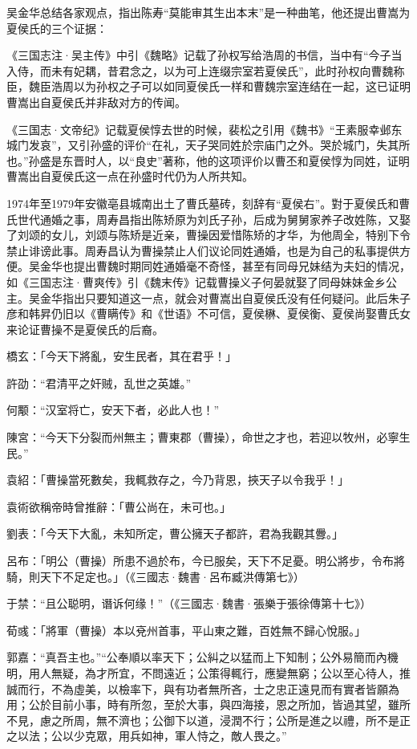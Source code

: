 吴金华总结各家观点，指出陈寿“莫能审其生出本末”是一种曲笔，他还提出曹嵩为夏侯氏的三个证据：

《三国志注·吴主传》中引《魏略》记载了孙权写给浩周的书信，当中有“今子当入侍，而未有妃耦，昔君念之，以为可上连缀宗室若夏侯氏”，此时孙权向曹魏称臣，魏臣浩周以为孙权之子可以如同夏侯氏一样和曹魏宗室连结在一起，这已证明曹嵩出自夏侯氏并非敌对方的传闻。

《三国志·文帝纪》记载夏侯惇去世的时候，裴松之引用《魏书》“王素服幸邺东城门发哀”，又引孙盛的评价“在礼，天子哭同姓於宗庙门之外。哭於城门，失其所也。”孙盛是东晋时人，以“良史”著称，他的这项评价以曹丕和夏侯惇为同姓，证明曹嵩出自夏侯氏这一点在孙盛时代仍为人所共知。

1974年至1979年安徽亳县城南出土了曹氏墓砖，刻辞有“夏侯右”。對于夏侯氏和曹氏世代通婚之事，周寿昌指出陈矫原为刘氏子孙，后成为舅舅家养子改姓陈，又娶了刘颂的女儿，刘颂与陈矫是近亲，曹操因爱惜陈矫的才华，为他周全，特别下令禁止诽谤此事。周寿昌认为曹操禁止人们议论同姓通婚，也是为自己的私事提供方便。吴金华也提出曹魏时期同姓通婚毫不奇怪，甚至有同母兄妹结为夫妇的情况，如《三国志注·曹爽传》引《魏末传》记载曹操义子何晏就娶了同母妹妹金乡公主。吴金华指出只要知道这一点，就会对曹嵩出自夏侯氏没有任何疑问。此后朱子彦和韩昇仍旧以《曹瞒传》和《世语》不可信，夏侯楙、夏侯衡、夏侯尚娶曹氏女来论证曹操不是夏侯氏的后裔。

橋玄：「今天下將亂，安生民者，其在君乎！」

許劭：“君清平之奸贼，乱世之英雄。”

何颙：“汉室将亡，安天下者，必此人也！”

陳宮：“今天下分裂而州無主；曹東郡（曹操），命世之才也，若迎以牧州，必寧生民。”

袁紹：「曹操當死數矣，我輒救存之，今乃背恩，挾天子以令我乎！」

袁術欲稱帝時曾推辭：「曹公尚在，未可也。」

劉表：「今天下大亂，未知所定，曹公擁天子都許，君為我觀其釁。」

呂布：「明公（曹操）所患不過於布，今已服矣，天下不足憂。明公將步，令布將騎，則天下不足定也。」（《三國志·魏書·呂布臧洪傳第七》）

于禁：“且公聪明，谮诉何缘！”（《三國志·魏書·張樂于張徐傳第十七》）

荀彧：「將軍（曹操）本以兗州首事，平山東之難，百姓無不歸心悅服。」

郭嘉：“真吾主也。”“公奉順以率天下；公糾之以猛而上下知制；公外易簡而內機明，用人無疑，為才所宜，不問遠近；公策得輒行，應變無窮；公以至心待人，推誠而行，不為虛美，以檢率下，與有功者無所吝，士之忠正遠見而有實者皆願為用；公於目前小事，時有所忽，至於大事，與四海接，恩之所加，皆過其望，雖所不見，慮之所周，無不濟也；公御下以道，浸潤不行；公所是進之以禮，所不是正之以法；公以少克眾，用兵如神，軍人恃之，敵人畏之。”

